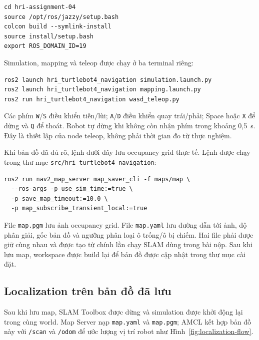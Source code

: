 \documentclass[12pt,a4paper]{article}
\begin{document}
\begin{verbatim}
cd hri-assignment-04
source /opt/ros/jazzy/setup.bash
colcon build --symlink-install
source install/setup.bash
export ROS_DOMAIN_ID=19
\end{verbatim}

Simulation, mapping và teleop được chạy ở ba terminal riêng:

\begin{verbatim}
ros2 launch hri_turtlebot4_navigation simulation.launch.py
ros2 launch hri_turtlebot4_navigation mapping.launch.py
ros2 run hri_turtlebot4_navigation wasd_teleop.py
\end{verbatim}

Các phím \texttt{W}/\texttt{S} điều khiển tiến/lùi;
\texttt{A}/\texttt{D} điều khiển quay trái/phải; Space hoặc \texttt{X} để dừng
và \texttt{Q} để thoát. Robot tự dừng khi không còn nhận phím trong khoảng
0,5~s. Đây là thiết lập của node teleop, không phải thời gian đo từ thực nghiệm.

Khi bản đồ đã đủ rõ, lệnh dưới đây lưu occupancy grid thực tế. Lệnh được chạy
trong thư mục \texttt{src/hri\_turtlebot4\_navigation}:

\begin{verbatim}
ros2 run nav2_map_server map_saver_cli -f maps/map \
  --ros-args -p use_sim_time:=true \
  -p save_map_timeout:=10.0 \
  -p map_subscribe_transient_local:=true
\end{verbatim}

File \texttt{map.pgm} lưu ảnh occupancy grid. File \texttt{map.yaml} lưu đường
dẫn tới ảnh, độ phân giải, gốc bản đồ và ngưỡng phân loại ô trống/ô bị chiếm.
Hai file phải được giữ cùng nhau và được tạo từ chính lần chạy SLAM dùng trong
bài nộp. Sau khi lưu map, workspace được build lại để bản đồ được cập nhật
trong thư mục cài đặt.

\subsection{Localization trên bản đồ đã lưu}

Sau khi lưu map, SLAM Toolbox được dừng và simulation được khởi động lại trong
cùng world. Map Server nạp \texttt{map.yaml} và \texttt{map.pgm}; AMCL kết hợp
bản đồ này với \texttt{/scan} và \texttt{/odom} để ước lượng vị trí robot như
Hình~\ref{fig:localization-flow}.
\end{document}
